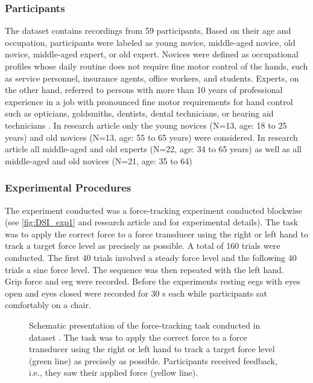 \subsubsection{Participants}
\label{methods:datasets:I:participants}
The dataset contains recordings from 59 participants, Based on their age and occupation, participants were labeled as young novice, middle-aged novice, old novice, middle-aged expert, or old expert. Novices were defined as occupational profiles whose daily routine does not require fine motor control of the hands, such as service personnel, insurance agents, office workers, and students. Experts, on the other hand, referred to persons with more than 10 years of professional experience in a job with pronounced fine motor requirements for hand control such as opticians, goldsmiths, dentists, dental technicians, or hearing aid technicians \cite{Ericsson1991}. In research article  only the young novices (N=13, age: 18 to 25 years) and old novices (N=13, age: 55 to 65 years) were considered. In research article  all middle-aged and old experts (N=22, age: 34 to 65 years) as well as all middle-aged and old novices (N=21, age: 35 to  64)

\subsubsection{Experimental Procedures}
\label{methods:datasets:I:experiment}
The experiment conducted was a force-tracking experiment conducted blockwise (see \autoref{fig:DSI_exp1} and research article  and  for experimental details). The task was to apply the correct force to a force transducer using the right or left hand to track a target force level as precisely as possible. A total of 160 trials were conducted. The first 40 trials involved a steady force level and the following 40 trials a sine force level. The sequence was then repeated with the left hand.\\
Grip force and \gls{eeg} were recorded. Before the experiments resting \glspl{eeg} with eyes open and eyes closed were recorded for 30 s each while participants sat comfortably on a chair.

\begin{figure}[h]
\begin{center}

\caption[Schematic presentation of the force-tracking task conducted in dataset .]{Schematic presentation of the force-tracking task conducted in dataset . The task was to apply the correct force to a force transducer using the right or left hand to track a target force level (green line) as precisely as possible. Participants received feedback, i.e., they saw their applied force (yellow line).}
\label{fig:DSI_exp1}
\end{center}
\end{figure}

